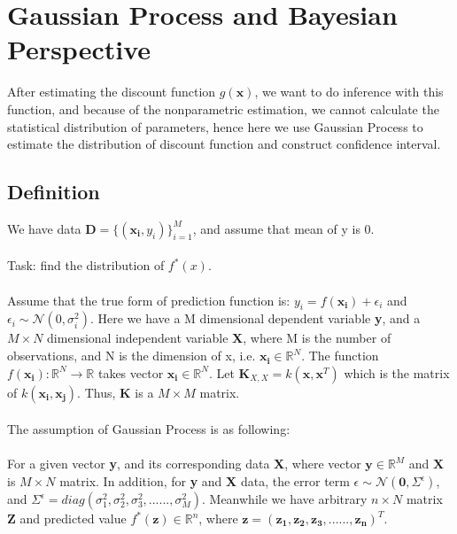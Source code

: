 \section{Gaussian Process and Bayesian Perspective}
After estimating the discount function $g(\boldsymbol{x})$, we want to do inference with this function, and because of the nonparametric estimation, we cannot calculate the statistical distribution of parameters, hence here we use Gaussian Process to estimate the distribution of discount function and construct confidence interval. 
\subsection{Definition}
We have data $\textbf{D} = \{ (\boldsymbol{x_i}, y_i) \} _{i=1} ^{M}$, and assume that mean of y is 0. 
\\ \\
Task: find the distribution of $ f^{*}(x) $.  
\\ \\
Assume that the true form of prediction function is: $y_i = f(\boldsymbol{x_i}) + \epsilon_i$ and $\epsilon_i \sim \mathcal{N}(0,\sigma_{i}^{2})$. Here we have a M dimensional dependent variable \textbf{y}, and a $M \times N$ dimensional independent variable \textbf{X}, where M is the number of observations, and N is the dimension of x, i.e. $\boldsymbol{x_i}\in \mathbb{R}^N $. The function 
$f(\boldsymbol{x_i}) : \mathbb{R}^N \to \mathbb{R}$ takes vector $\boldsymbol{x_i} \in \mathbb{R}^N$. Let $\boldsymbol{K}_{X, X} = k(\boldsymbol{x},\boldsymbol{x}^T)$ which is the matrix of $k(\boldsymbol{x_i}, \boldsymbol{x_j})$. Thus, \textbf{K} is a $M \times M$ matrix. 
\\ \\
The assumption of Gaussian Process is as following: \\ \\
For a given vector \textbf{y}, and its corresponding data \textbf{X}, where vector $ \boldsymbol{y} \in \mathbb{R}^M$ and $\boldsymbol{X}$ is $M \times N$ matrix. In addition, for \textbf{y} and \textbf{X} data, the error term $\epsilon \sim \mathcal{N}(\boldsymbol{0},\varSigma^{\epsilon})$, and $\varSigma^{\epsilon} = diag(\sigma_{1}^{2}, \sigma_{2}^{2}, \sigma_{3}^{2}, ......, \sigma_{M}^{2}) $.  Meanwhile we have arbitrary $n \times N$ matrix \textbf{Z} and predicted value $f^{*}(\boldsymbol{z}) \in \mathbb{R}^n$, where $ \boldsymbol{z} = (\boldsymbol{z_1, z_2, z_3, ......, z_n})^T$. \\ \\
